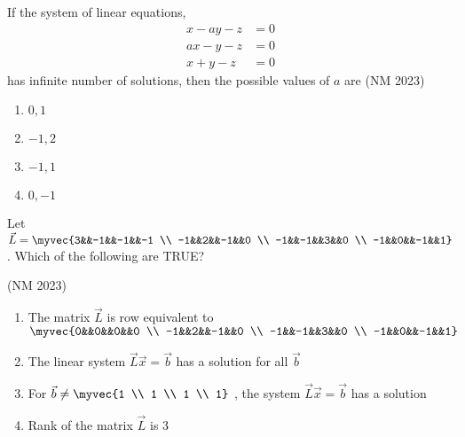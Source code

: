 \item If the system of linear equations, 
	\begin{align*}
	x-ay-z&=0\\ ax-y-z&=0\\ x+y-z&=0
\end{align*}
	has infinite number of solutions, then the possible values of $a$ are 
	\hfill (NM 2023)
\begin{multicols}{4}
\begin{enumerate}
     \item $0,1$
     \item $-1,2$
     \item $-1,1$
     \item $0,-1$
\end{enumerate}
\end{multicols}
\item Let $\vec{L}=\myvec{3&&-1&&-1&&-1 \\ -1&&2&&-1&&0 \\ -1&&-1&&3&&0 \\ -1&&0&&-1&&1}$. Which of the following are TRUE?

	\hfill (NM 2023)
\begin{enumerate}
    \item The matrix $\vec{L}$ is row equivalent to $\myvec{0&&0&&0&&0 \\ -1&&2&&-1&&0 \\ -1&&-1&&3&&0 \\ -1&&0&&-1&&1} $
    \item  The linear system $\vec{L}\vec{x}=\vec{b}$ has a solution for all $\vec{b}$
    \item For $\vec{b} \neq \myvec{1 \\ 1 \\ 1 \\ 1}$ ,  the system $\vec{L}\vec{x}=\vec{b}$ has a solution 
    \item Rank of the matrix $\vec{L}$ is 3 
\end{enumerate}
